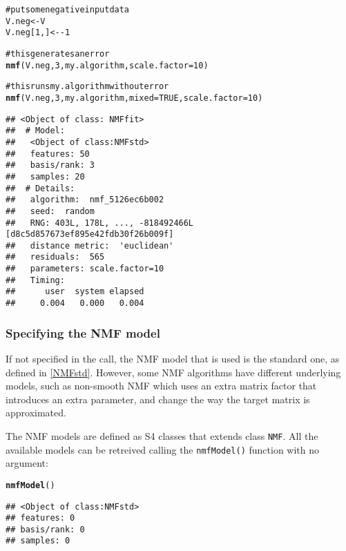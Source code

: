\documentclass[a4paper]{article}\usepackage{graphicx, color}
\makeatletter
\newcommand{\hlfunctioncall}[1]{\textcolor[rgb]{0.501960784313725,0,0.329411764705882}{\textbf{#1}}}%
\newcommand{\hlcomment}[1]{\textcolor[rgb]{0.180392156862745,0.6,0.341176470588235}{#1}}%
\newenvironment{kframe}{%
 \def\at@end@of@kframe{}%
 \ifinner\ifhmode%
  \def\at@end@of@kframe{\end{minipage}}%
  \begin{minipage}{\columnwidth}%
 \fi\fi%
 \def\FrameCommand##1{\hskip\@totalleftmargin \hskip-\fboxsep
 \colorbox{shadecolor}{##1}\hskip-\fboxsep
     \hskip-\linewidth \hskip-\@totalleftmargin \hskip\columnwidth}%
 \MakeFramed {\advance\hsize-\width
   \@totalleftmargin\z@ \linewidth\hsize
   \@setminipage}}%
 {\par\unskip\endMakeFramed%
 \at@end@of@kframe}
\newenvironment{knitrout}{}{} %
\let\code=\texttt
\renewcommand{\cite}[1]{\parencite{#1}}
\makeatother
\begin{document}
\begin{knitrout}
\color{fgcolor}\begin{kframe}
\begin{alltt}
\hlcomment{# put some negative input data}
V.neg <- V
V.neg[1, ] <- -1

\hlcomment{# this generates an error}
\hlfunctioncall{nmf}(V.neg, 3, my.algorithm, scale.factor = 10)
\end{alltt}


{\ttfamily\noindent\bfseries\color{errorcolor}{\#\# Error: NMF::nmf - Input matrix x contains some negative entries.}}\begin{alltt}

\hlcomment{# this runs my.algorithm without error}
\hlfunctioncall{nmf}(V.neg, 3, my.algorithm, mixed = TRUE, scale.factor = 10)
\end{alltt}
\begin{verbatim}
## <Object of class: NMFfit>
##  # Model:
##   <Object of class:NMFstd>
##   features: 50 
##   basis/rank: 3 
##   samples: 20 
##  # Details:
##   algorithm:  nmf_5126ec6b002 
##   seed:  random 
##   RNG: 403L, 178L, ..., -818492466L [d8c5d857673ef895e42fdb30f26b009f]
##   distance metric:  'euclidean' 
##   residuals:  565 
##   parameters: scale.factor=10 
##   Timing:
##      user  system elapsed 
##     0.004   0.000   0.004
\end{verbatim}
\end{kframe}
\end{knitrout}


\subsubsection{Specifying the NMF model}
If not specified in the call, the NMF model that is used is the standard one, as defined in \cref{NMFstd}. 
However, some NMF algorithms have different underlying models, such as non-smooth NMF \cite{Pascual-Montano2006} which uses an extra matrix factor that introduces an extra parameter, and change the way the target matrix is approximated.

The NMF models are defined as S4 classes that extends class \code{NMF}. All the available models can be retreived calling the \code{nmfModel()} function with no 
argument:

\begin{knitrout}
\color{fgcolor}\begin{kframe}
\begin{alltt}
\hlfunctioncall{nmfModel}()
\end{alltt}
\begin{verbatim}
## <Object of class:NMFstd>
## features: 0 
## basis/rank: 0 
## samples: 0
\end{verbatim}
\end{kframe}
\end{knitrout}
\end{document}
